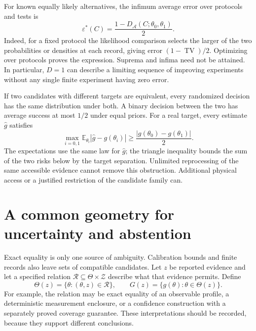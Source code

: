 For known equally likely alternatives, the infimum average error over
protocols and tests is
\begin{equation}\label{foundations:bayes}
 \varepsilon^*(C)=\frac{1-D_{\mathcal A}(C;\theta_0,\theta_1)}{2}.
\end{equation}
Indeed, for a fixed protocol the likelihood comparison selects the larger
of the two probabilities or densities at each record, giving error
$(1-\operatorname{TV})/2$. Optimizing over protocols proves the expression.
Suprema and infima need not be attained. In particular, $D=1$ can describe
a limiting sequence of improving experiments without any single finite
experiment having zero error.

If two candidates with different targets are equivalent, every randomized
decision has the same distribution under both. A binary decision between
the two has average success at most $1/2$ under equal priors. For a real
target, every estimate $\widehat g$ satisfies
\begin{equation}\label{foundations:losslower}
 \max_{i=0,1}\mathbb E_{\theta_i}
       |\widehat g-g(\theta_i)|
 \geq \frac{|g(\theta_0)-g(\theta_1)|}{2}.
\end{equation}
The expectations use the same law for $\widehat g$; the triangle
inequality bounds the sum of the two risks below by the target separation.
Unlimited reprocessing of the same accessible evidence cannot remove this
obstruction. Additional physical access or a justified restriction of the
candidate family can.

\section{A common geometry for uncertainty and abstention}

Exact equality is only one source of ambiguity. Calibration bounds and
finite records also leave sets of compatible candidates. Let $z$ be reported
evidence and let a specified relation $\mathcal R\subseteq\Theta\times
\mathcal Z$ describe what that evidence permits. Define
\begin{equation}
 \Theta(z)=\{\theta:(\theta,z)\in\mathcal R\},\qquad
 G(z)=\{g(\theta):\theta\in\Theta(z)\}.
\end{equation}
For example, the relation may be exact equality of an observable profile,
a deterministic measurement enclosure, or a confidence construction with
a separately proved coverage guarantee. These interpretations should be
recorded, because they support different conclusions.

